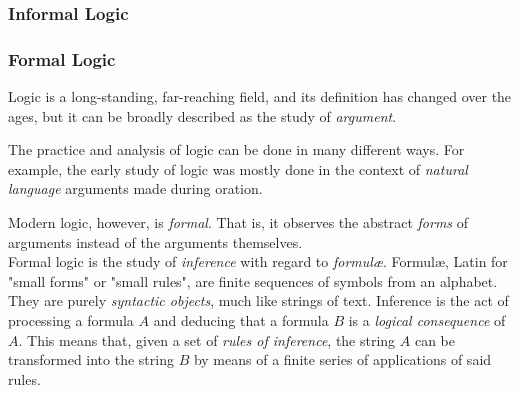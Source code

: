 \subsubsection{Informal Logic}



\subsubsection{Formal Logic}


Logic is a long-standing, far-reaching field, and its definition has changed over the ages, but it can be broadly described as the study of \textit{argument}. 

The practice and analysis of logic can be done in many different ways. For example, the early study of logic was mostly done in the context of \textit{natural language} arguments made during oration.



Modern logic, however, is \textit{formal}. That is, it observes the abstract \textit{forms} of arguments instead of the arguments themselves. \\


Formal logic is the study of \textit{inference} with regard to \textit{formul{\ae}}. Formul{\ae}, Latin for "small forms" or "small rules", are finite sequences of symbols from an alphabet. They are purely \textit{syntactic objects}, much like strings of text. Inference is the act of processing a formula $A$ and deducing that a formula $B$ is a \textit{logical consequence} of $A$. This means that, given a set of \textit{rules of inference}, the string $A$ can be transformed into the string $B$ by means of a finite series of applications of said rules. \\


